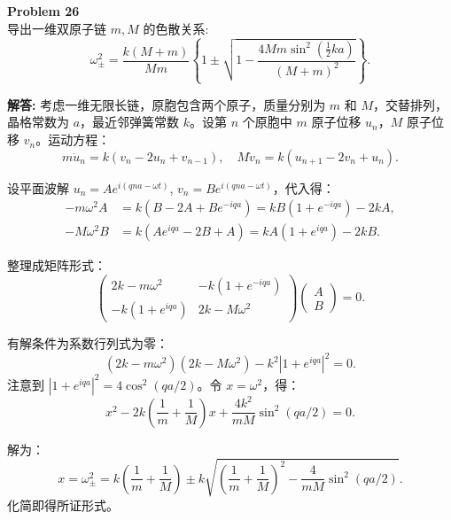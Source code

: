 \documentclass[12pt, a4paper, oneside]{ctexart}
\newenvironment{solution}{\par\noindent\textbf{解答:}\quad}{\par}
\begin{document}
\begin{mdframed}[backgroundcolor=gray!10, linewidth=0pt]
    \textbf{Problem 26} \\
    导出一维双原子链 \(m, M\) 的色散关系:
    \[
    \omega_{\pm}^2 = \frac{k(M+m)}{M m} \left\{ 1 \pm \sqrt{ 1 - \frac{4 M m \sin^2\left(\frac{1}{2} k a\right)}{(M+m)^2} } \right\}.
    \]
\end{mdframed}
\begin{solution}
    考虑一维无限长链，原胞包含两个原子，质量分别为 \(m\) 和 \(M\)，交替排列，晶格常数为 \(a\)，最近邻弹簧常数 \(k\)。设第 \(n\) 个原胞中 \(m\) 原子位移 \(u_n\)，\(M\) 原子位移 \(v_n\)。运动方程：
    \[
    m \ddot{u}_n = k(v_n - 2u_n + v_{n-1}), \quad M \ddot{v}_n = k(u_{n+1} - 2v_n + u_n).
    \]
    
    设平面波解 \(u_n = A e^{i(q n a - \omega t)}\), \(v_n = B e^{i(q n a - \omega t)}\)，代入得：
    \begin{align*}
        -m \omega^2 A &= k (B - 2A + B e^{-i q a}) = k B (1+e^{-iqa}) - 2k A, \\
        -M \omega^2 B &= k (A e^{i q a} - 2B + A) = k A (1+e^{iqa}) - 2k B.
    \end{align*}
    
    整理成矩阵形式：
    \[
    \begin{pmatrix}
        2k - m\omega^2 & -k(1+e^{-iqa}) \\
        -k(1+e^{iqa}) & 2k - M\omega^2
    \end{pmatrix}
    \begin{pmatrix} A \\ B \end{pmatrix} = 0.
    \]
    
    有解条件为系数行列式为零：
    \[
    (2k - m\omega^2)(2k - M\omega^2) - k^2 |1+e^{iqa}|^2 = 0.
    \]
    注意到 \(|1+e^{iqa}|^2 = 4 \cos^2(qa/2)\)。令 \(x = \omega^2\)，得：
    \[
    x^2 - 2k\left(\frac{1}{m}+\frac{1}{M}\right) x + \frac{4k^2}{mM} \sin^2(qa/2) = 0.
    \]
    
    解为：
    \[
    x = \omega_{\pm}^2 = k \left( \frac{1}{m}+\frac{1}{M} \right) \pm k \sqrt{ \left( \frac{1}{m}+\frac{1}{M} \right)^2 - \frac{4}{mM} \sin^2(qa/2) }.
    \]
    化简即得所证形式。
\end{solution}
\end{document}
